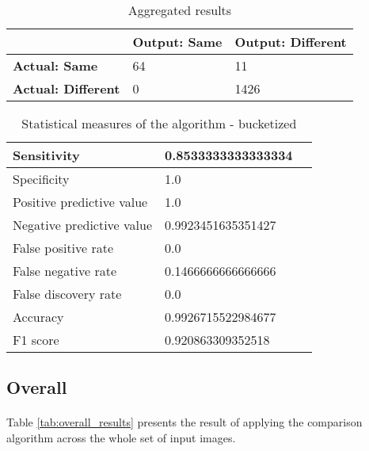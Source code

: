 \begin{table}[H]
    \centering
	\begin{spacing}{1.5}
    \begin{tabular}{|l|l|l|}
        \hline
        \cellcolor{gray} & \textbf{Output: Same} & \textbf{Output: Different} \\ [0.5ex]
        \hline\hline
        \textbf{Actual: Same} & 64 & 11 \\ [0.5ex]
        \hline
        \textbf{Actual: Different} & 0 & 1426 \\ [0.5ex]
        \hline
    \end{tabular}
    \end{spacing}
    \caption{Aggregated results}
    \label{tab:bucketized_results}
\end{table}
        
\begin{table}[H]
    \centering
	\begin{spacing}{1.5}    
    \begin{tabular}{|l|l|l|}
        \hline
        Sensitivity                 & 0.8533333333333334 \\
        \hline
        Specificity                 & 1.0 \\
        \hline
        Positive predictive value   & 1.0 \\
        \hline
        Negative predictive value   & 0.9923451635351427 \\
        \hline
        False positive rate         & 0.0 \\
        \hline
        False negative rate         & 0.1466666666666666 \\
        \hline
        False discovery rate        & 0.0 \\
        \hline
        Accuracy                    & 0.9926715522984677 \\
        \hline
        F1 score                    & 0.920863309352518 \\
        \hline
    \end{tabular}
    \end{spacing}
    \caption{Statistical measures of the algorithm - bucketized}
\end{table}

\subsection{Overall}
\paragraph{}
Table \ref{tab:overall_results} presents the result of applying the comparison algorithm across the whole set of input images.

